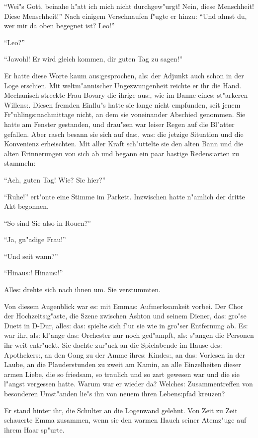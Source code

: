 \documentclass[oneside,12pt]{book}
\newcommand{\s}{s:}%
\begin{document}
"`Wei"s Gott, beinahe h"att ich mich nicht durchgew"urgt! Nein,
diese Mensch\-heit! Diese Mensch\-heit!"' Nach einigem
Verschnaufen f"ugte er hinzu: "`Und ahnst du, wer mir da oben
begegnet ist? Leo!"'

"`Leo?"'

"`Jawohl! Er wird gleich kommen, dir guten Tag zu sagen!"'

Er hatte diese Worte kaum au{\s}gesprochen, al{\s} der Adjunkt
auch schon in der Loge erschien. Mit weltm"annischer
Ungezwungenheit reichte er ihr die Hand. Mechanisch streckte Frau
Bovary die ihrige au{\s}, wie im Banne eine{\s} st"arkeren
Willen{\s}. Diesen fremden Einflu"s hatte sie lange nicht
empfunden, seit jenem Fr"uhling{\s}nachmittage nicht, an dem sie
voneinander Abschied genommen. Sie hatte am Fenster gestanden, und
drau"sen war leiser Regen auf die Bl"atter gefallen. Aber rasch
besann sie sich auf da{\s}, wa{\s} die jetzige Situation und die
Konvenienz erheischten. Mit aller Kraft sch"uttelte sie den alten
Bann und die alten Erinnerungen von sich ab und begann ein paar
hastige Reden{\s}arten zu stammeln:

"`Ach, guten Tag! Wie? Sie hier?"'

"`Ruhe!"' ert"onte eine Stimme im Parkett. Inzwischen hatte
n"amlich der dritte Akt begonnen.

"`So sind Sie also in Rouen?"'

"`Ja, gn"adige Frau!"'

"`Und seit wann?"'

"`Hinau{\s}! Hinau{\s}!"'

Alle{\s} drehte sich nach ihnen um. Sie verstummten.

Von diesem Augenblick war e{\s} mit Emma{\s} Aufmerksamkeit
vorbei. Der Chor der Hochzeit{\s}g"aste, die Szene zwischen Ashton
und seinem Diener, da{\s} gro"se Duett in D-Dur, alle{\s} da{\s}
spielte sich f"ur sie wie in gro"ser Entfernung ab. E{\s} war ihr,
al{\s} kl"ange da{\s} Orchester nur noch ged"ampft, al{\s} s"angen
die Personen ihr weit entr"uckt. Sie dachte zur"uck an die
Spielabende im Hause de{\s} Apotheker{\s}, an den Gang zu der Amme
ihre{\s} Kinde{\s}, an da{\s} Vorlesen in der Laube, an die
Plauderstunden zu zweit am Kamin, an alle Einzelheiten dieser
armen Liebe, die so friedsam, so traulich und so zart gewesen war
und die sie l"angst vergessen hatte. Warum war er wieder da?
Welche{\s} Zusammentreffen von besonderen Umst"anden lie"s ihn von
neuem ihren Leben{\s}pfad kreuzen?

Er stand hinter ihr, die Schulter an die Logenwand gelehnt. Von
Zeit zu Zeit schauerte Emma zusammen, wenn sie den warmen Hauch
seiner Atemz"uge auf ihrem Haar sp"urte.
\end{document}

